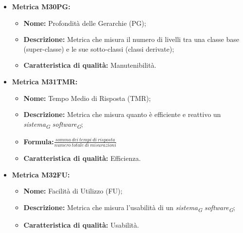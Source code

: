 \begin{itemize}
    \vspace{0.4cm}
    \item \hypertarget{item:M30PG}{\textbf{Metrica M30PG:}}
    \vspace{0.2cm}
        
    \begin{minipage}[H]{0.9\textwidth}
        \begin{itemize}
            \item \textbf{Nome:} Profondità delle Gerarchie (PG);
            \item \textbf{Descrizione:} Metrica che misura il numero di livelli tra una classe base (super-classe) e le sue sotto-classi (classi derivate);
            \item \textbf{Caratteristica di qualità:} Manutenibilità.
        \end{itemize} 
    \end{minipage}

    \vspace{0.4cm}
    \item \hypertarget{item:M31TMR}{\textbf{Metrica M31TMR:}}
    \vspace{0.2cm}
    
    \begin{minipage}[H]{0.9\textwidth}
        \begin{itemize}
            \item \textbf{Nome:} Tempo Medio di Risposta (TMR);
            \item \textbf{Descrizione:} Metrica che misura quanto è efficiente e reattivo un \textit{sistema}\textsubscript{\textit{G}} \textit{software}\textsubscript{\textit{G}};
            \item \textbf{Formula:}$\frac{somma \ dei \ tempi \ di \ risposta}{numero \ totale \ di \ misurazioni}$
            \item \textbf{Caratteristica di qualità:} Efficienza.
        \end{itemize}
    \end{minipage}  

    \pagebreak
    \item \hypertarget{item:M32FU}{\textbf{Metrica M32FU:}}
    \vspace{0.2cm}
        
    \begin{minipage}[H]{0.9\textwidth}
        \begin{itemize}
            \item \textbf{Nome:} Facilità di Utilizzo (FU);
            \item \textbf{Descrizione:} Metrica che misura l'usabilità di un \textit{sistema}\textsubscript{\textit{G}} \textit{software}\textsubscript{\textit{G}};
            \item \textbf{Caratteristica di qualità:} Usabilità.
        \end{itemize}
    \end{minipage}


\end{itemize}
